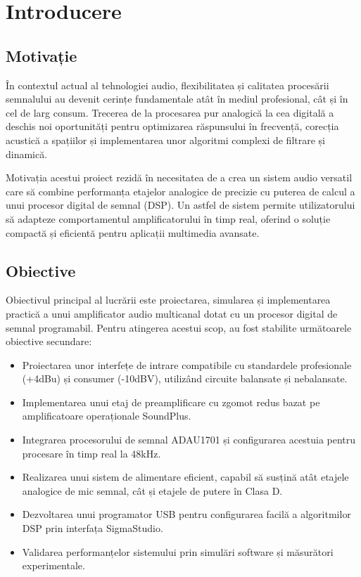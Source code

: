 \chapter*{Introducere}

\section*{Motivație}

În contextul actual al tehnologiei audio, flexibilitatea și calitatea procesării semnalului au devenit cerințe fundamentale atât în mediul profesional, cât și în cel de larg consum. Trecerea de la procesarea pur analogică la cea digitală a deschis noi oportunități pentru optimizarea răspunsului în frecvență, corecția acustică a spațiilor și implementarea unor algoritmi complexi de filtrare și dinamică.

Motivația acestui proiect rezidă în necesitatea de a crea un sistem audio versatil care să combine performanța etajelor analogice de precizie cu puterea de calcul a unui procesor digital de semnal (DSP). Un astfel de sistem permite utilizatorului să adapteze comportamentul amplificatorului în timp real, oferind o soluție compactă și eficientă pentru aplicații multimedia avansate.

\section*{Obiective}

Obiectivul principal al lucrării este proiectarea, simularea și implementarea practică a unui amplificator audio multicanal dotat cu un procesor digital de semnal programabil. Pentru atingerea acestui scop, au fost stabilite următoarele obiective secundare:
\begin{itemize}
    \item Proiectarea unor interfețe de intrare compatibile cu standardele profesionale (+4dBu) și consumer (-10dBV), utilizând circuite balansate și nebalansate.
    \item Implementarea unui etaj de preamplificare cu zgomot redus bazat pe amplificatoare operaționale SoundPlus\texttrademark.
    \item Integrarea procesorului de semnal ADAU1701 și configurarea acestuia pentru procesare în timp real la 48kHz.
    \item Realizarea unui sistem de alimentare eficient, capabil să susțină atât etajele analogice de mic semnal, cât și etajele de putere în Clasa D.
    \item Dezvoltarea unui programator USB pentru configurarea facilă a algoritmilor DSP prin interfața SigmaStudio.
    \item Validarea performanțelor sistemului prin simulări software și măsurători experimentale.
\end{itemize}

